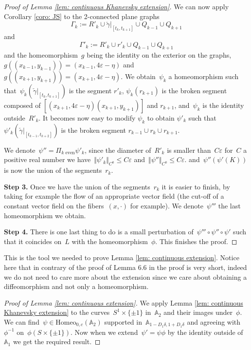 \documentclass[10pt]{amsart}
\begin{document}
\begin{proof}[Proof of Lemma \ref{lem: continuous Khanevsky extension}]
We can now apply Corollary \ref{coro: JS} to the 2-connected plane graphs
\[\Gamma_k:=R'_k \cup \check\gamma\vert_{[t_{k},t_{k+1}]}\cup Q_{k-1}\cup Q_{k+1}\]
and
\[\Gamma'_k:=R'_k \cup r'_k \cup Q_{k-1} \cup Q_{k+1}\]
and the homeomorphism~$g$ being the identity on the exterior on the graphs, $g((x_{k-1},y_{k-1}))=(x_{k-1}, 4\varepsilon-\eta)$ and $g((x_{k+1},y_{k+1}))=(x_{k+1}, 4\varepsilon-\eta)$. We obtain~$\psi_k$ a homeomorphism such that~$\psi_k(\check\gamma\vert_{[t_{k},t_{k+1}]})$ is the segment $r'_k$, $\psi_k(r_{k+1})$ is the broken segment composed of $[(x_{k+1},4\varepsilon-\eta)(x_{k+1}, y_{k+1})]$ and $r_{k+1}$, and~$\psi_k$ is the identity outside~$R'_k$. It becomes now easy to modify $\psi_k$ to obtain $\psi'_k$ such that $\psi'_k(\check{\gamma}\vert_{[t_{k-1},t_{k+2}]})$ is the broken segment $r_{k-1} \cup r_k \cup r_{k+1}$.

We denote~$\psi''=\Pi_{k \text{ even}}\psi'_k$, since the diameter of~$R'_k$ is smaller than~$C\varepsilon$ for~$C$ a positive real number we have~$\Vert \psi'_k \Vert_{C^0}\leq C \varepsilon$ and~$\Vert \psi'' \Vert_{C^0}\leq C\varepsilon$. 
and~$\psi'' (\psi'(K))$ is now the union of the segments~$r_k$.

\medskip

\noindent \textbf{Step 3.} Once we have the union of the segments~$r_k$ it is easier to finish, by taking for example the flow of an appropriate vector field (the cut-off of a constant vector field on the fibers~$(x,\cdot)$ for example). We denote~$\psi'''$ the last homeomorphism we obtain.

\medskip

\noindent \textbf{Step 4.} There is one last thing to do is a small perturbation of~$\psi''' \circ \psi'' \circ \psi'$ such that it coincides on~$L$ with the homeomorphism~$\phi$. This finishes the proof.

\end{proof}

This is the tool we needed to prove Lemma \ref{lem: continuous extension}. Notice here that in contrary of the proof of Lemma 6.6 in \cite{EPP} the proof is very short, indeed we do not need to care more about the extension since we care about obtaining a diffeomorphism and not only a homeomorphism.

\begin{proof}[Proof of Lemma \ref{lem: continuous extension}]
We apply Lemma \ref{lem: continuous Khanevsky extension} to the curves~$S^1\times \{\pm1 \}$ in~$\mathbb{A}_2$ and their images under~$\phi$. We can find~$\psi \in \text{Homeo}_{0,c}(\mathbb{A}_{2})$ supported in~$\mathbb{A}_{1-D_1\delta,1+D_1\delta}$ and agreeing with~$\phi^{-1}$ on~$\phi(S \times \{\pm 1\})$. Now when we extend~$\psi'=\psi \phi$ by the identity outside of~$\mathbb{A}_1$ we get the required result. 
\end{proof}
\end{document}
